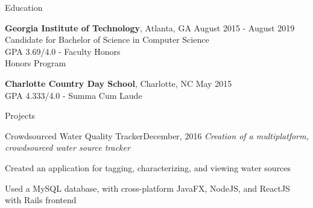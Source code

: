 \documentclass{resume} %
\begin{document}
\begin{rSection}{Education}

  \textbf{Georgia Institute of Technology}, Atlanta, GA \hfill {August 2015 - August 2019}
  \\ Candidate for Bachelor of Science in Computer Science
  \\ GPA 3.69/4.0 - Faculty Honors
  \\ Honors Program

  \textbf{Charlotte Country Day School}, Charlotte, NC \hfill {May 2015}
  \\ GPA 4.333/4.0 - Summa Cum Laude

\end{rSection}


\begin{rSection}{Projects}

  \begin{rSubsection}{Crowdsourced Water Quality Tracker}{December, 2016}{}{}
  \textit{Creation of a multiplatform, crowdsourced water source tracker}
  \item Created an application for tagging, characterizing, and viewing water sources
  \item Used a MySQL database, with cross-platform JavaFX, NodeJS, and ReactJS
    with Rails frontend
  \end{rSubsection}

\end{rSection}


\end{document}
